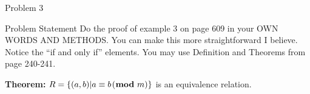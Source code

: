 \begin{problem}{Problem 3}
    \begin{statement}{Problem Statement}
        Do the proof of example 3 on page 609 in your OWN WORDS AND METHODS. You can make this more straightforward I believe. Notice the “if and only if” elements. You may use Definition and Theorems 
        from page 240-241.
    \end{statement}

    \begin{highlight}[Solution]
        \noindent \textbf{Theorem:} $R = \{(a,b) | a \equiv b \hspace*{1pt} (\hspace*{-3pt} \text{ \textbf{mod} } m)\}$ is an equivalence relation. \vspace*{1em}


\end{highlight}
\end{problem}

